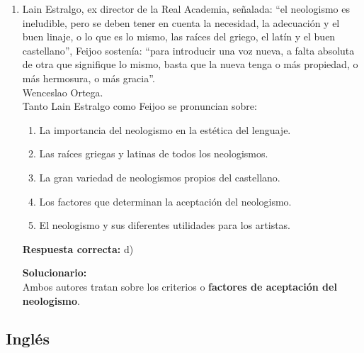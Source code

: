 \begin{enumerate}
	\vspace{2mm}
	\textbf{Solucionario:}\\
	El orden lógico parte del diccionario general, pasa al específico y luego explica su uso: \textbf{III – IV – I – V – II}.
	
	\vspace{6mm}
	
	\item Lain Estralgo, ex director de la Real Academia, señalada: “el neologismo es ineludible, pero se deben tener en cuenta la necesidad, la adecuación y el buen linaje, o lo que es lo mismo, las raíces del griego, el latín y el buen castellano”, Feijoo sostenía: “para introducir una voz nueva, a falta absoluta de otra que signifique lo mismo, basta que la nueva tenga o más propiedad, o más hermosura, o más gracia”.\\
	Wenceslao Ortega.\\
	Tanto Lain Estralgo como Feijoo se pronuncian sobre:
	\begin{enumerate}[label=\alph*)]
		\item La importancia del neologismo en la estética del lenguaje.
		\item Las raíces griegas y latinas de todos los neologismos.
		\item La gran variedad de neologismos propios del castellano.
		\item Los factores que determinan la aceptación del neologismo.
		\item El neologismo y sus diferentes utilidades para los artistas.
	\end{enumerate}
	\textbf{Respuesta correcta:} d)
	
	\vspace{2mm}
	\textbf{Solucionario:}\\
	Ambos autores tratan sobre los criterios o \textbf{factores de aceptación del neologismo}.
	
	\vspace{6mm}
	
\end{enumerate}

\subsection*{Inglés}

